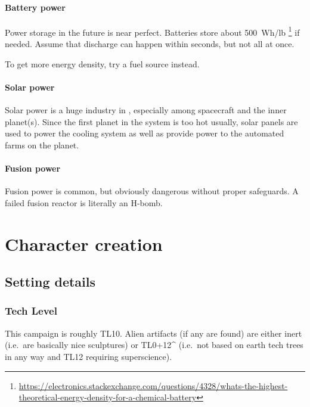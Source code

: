 \subsubsection{Battery power}
\label{sec:battery-power}

Power storage in the future is near perfect. Batteries store about 500~Wh/lb%
\footnote{\url{https://electronics.stackexchange.com/questions/4328/whats-the-highest-theoretical-energy-density-for-a-chemical-battery}}
if needed. Assume that discharge can happen within seconds, but not all at once.

To get more energy density, try a fuel source instead.

\subsubsection{Solar power}
\label{sec:solar-power}

Solar power is a huge industry in , especially among spacecraft and
the inner planet(s). Since the first planet in the system is too hot usually,
solar panels are used to power the cooling system as well as provide power to
the automated farms on the planet.

\subsubsection{Fusion power}
\label{sec:fusion-power}

Fusion power is common, but obviously dangerous without proper safeguards. A
failed fusion reactor is literally an H-bomb.


\chapter{Character creation}
\label{cha:character-creation}

\section{Setting details}
\label{sec:setting-details}

\subsection{Tech Level}
\label{sec:tech-level}

This campaign is roughly TL10. Alien artifacts (if any are found) are either
inert (i.e.~are basically nice sculptures) or TL0+12\^{} (i.e.~not based on
earth tech trees in any way and TL12 requiring superscience).

